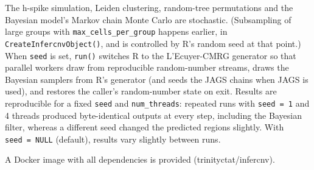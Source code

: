 The h-spike simulation, Leiden clustering, random-tree permutations and the Bayesian model's Markov chain Monte Carlo are stochastic. (Subsampling of large groups with \texttt{max\_cells\_per\_group} happens earlier, in \texttt{CreateInfercnvObject()}, and is controlled by R's random seed at that point.) When \texttt{seed} is set, \texttt{run()} switches R to the L'Ecuyer-CMRG generator so that parallel workers draw from reproducible random-number streams, draws the Bayesian samplers from R's generator (and seeds the JAGS chains when JAGS is used), and restores the caller's random-number state on exit. Results are reproducible for a fixed \texttt{seed} and \texttt{num\_threads}: repeated runs with \texttt{seed = 1} and 4 threads produced byte-identical outputs at every step, including the Bayesian filter, whereas a different seed changed the predicted regions slightly. With \texttt{seed\ =\ NULL} (default), results vary slightly between runs.

A Docker image with all dependencies is provided (trinityctat/infercnv).

